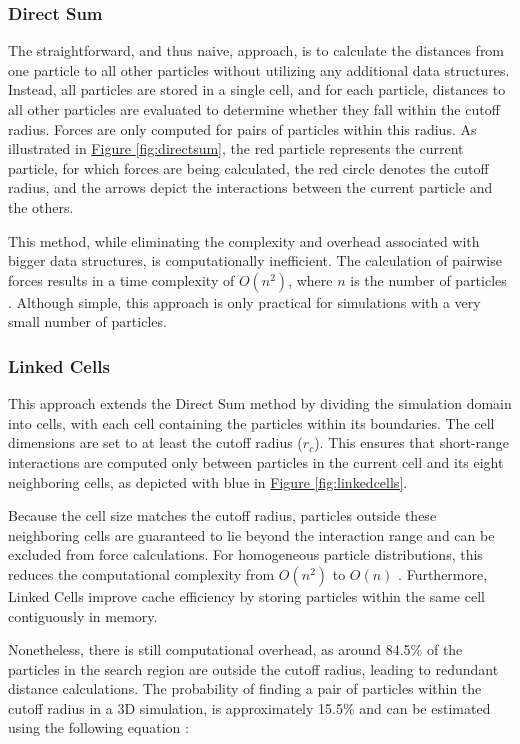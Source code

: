 \subsubsection{Direct Sum}

The straightforward, and thus naive, approach, is to calculate the distances from one particle to all other particles without utilizing any additional data structures. Instead, all particles are stored in a single cell, and for each particle, distances to all other particles are evaluated to determine whether they fall within the cutoff radius. Forces are only computed for pairs of particles within this radius. As illustrated in \hyperref[fig:directsum]{Figure \ref*{fig:directsum}}, the red particle represents the current particle, for which forces are being calculated, the red circle denotes the cutoff radius, and the arrows depict the interactions between the current particle and the others.

This method, while eliminating the complexity and overhead associated with bigger data structures, is computationally inefficient. The calculation of pairwise forces results in a time complexity of \(O(n^2)\), where \(n\) is the number of particles \parencite{gratl2022n}. Although simple, this approach is only practical for simulations with a very small number of particles.


\subsubsection{Linked Cells}

This approach extends the Direct Sum method by dividing the simulation domain into cells, with each cell containing the particles within its boundaries. The cell dimensions are set to at least the cutoff radius (\(r_c\)). This ensures that short-range interactions are computed only between particles in the current cell and its eight neighboring cells, as depicted with blue in \hyperref[fig:linkedcells]{Figure \ref*{fig:linkedcells}}.

Because the cell size matches the cutoff radius, particles outside these neighboring cells are guaranteed to lie beyond the interaction range and can be excluded from force calculations. For homogeneous particle distributions, this reduces the computational complexity from \(O(n^2)\) to \(O(n)\) \parencite{knapek2007numerical}. Furthermore, Linked Cells improve cache efficiency by storing particles within the same cell contiguously in memory. 

Nonetheless, there is still computational overhead, as around 84.5\% of the particles in the search region are outside the cutoff radius, leading to redundant distance calculations. The probability of finding a pair of particles within the cutoff radius in a 3D simulation, is approximately 15.5\% and can be estimated using the following equation \parencite{gratl2019autopas}:

